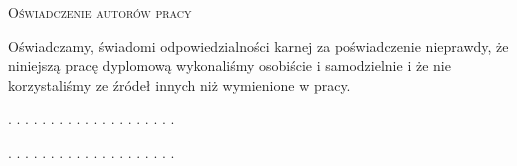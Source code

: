 \thispagestyle{zzz}
\vspace*{\fill}
\begin{center}
\Large\textsc{Oświadczenie autorów pracy}
\end{center}
\begin{addmargin}[5em]{1em}%
Oświadczamy, świadomi odpowiedzialności karnej za poświadczenie nieprawdy, że niniejszą pracę dyplomową wykonaliśmy osobiście i samodzielnie i że nie korzystaliśmy ze źródeł innych niż wymienione w pracy.
\end{addmargin}
\vspace{1cm}
\begin{flushright}
. . . . . . . . . . . . . . . . . . . .\vspace{1cm}

. . . . . . . . . . . . . . . . . . . .
\end{flushright}
\vspace{3cm}